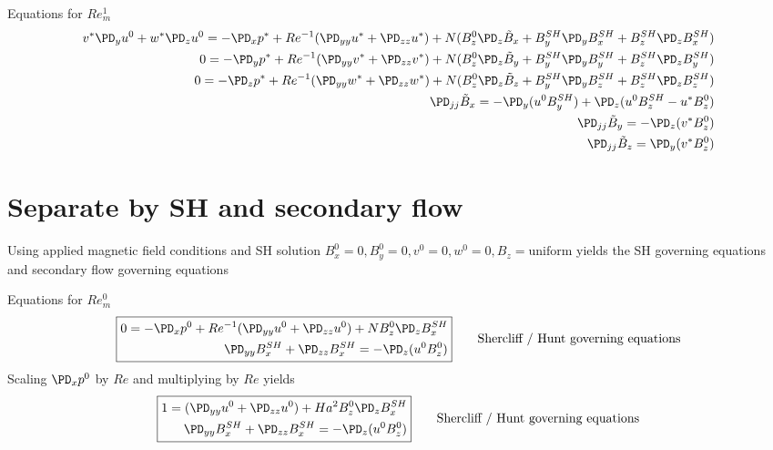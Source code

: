 \documentclass[11pt]{article}
\newcommand{\BS}{B^{SH}}
\newcommand{\BT}{\tilde{B}}
\begin{document}
Equations for $Re_m^1 $
\small\begin{equation}\begin{aligned}
v^* \PD_y u^0 + w^* \PD_z u^0 = -\PD_x p^*+ Re^{-1} (\PD_{yy} u^* + \PD_{zz} u^*) + N ( B_z^0 \PD_z \BT_x + \BS_y \PD_y \BS_x + \BS_z \PD_z \BS_x ) \\
0                             = -\PD_y p^*+ Re^{-1} (\PD_{yy} v^* + \PD_{zz} v^*) + N ( B_z^0 \PD_z \BT_y + \BS_y \PD_y \BS_y + \BS_z \PD_z \BS_y ) \\
0                             = -\PD_z p^*+ Re^{-1} (\PD_{yy} w^* + \PD_{zz} w^*) + N ( B_z^0 \PD_z \BT_z + \BS_y \PD_y \BS_z + \BS_z \PD_z \BS_z ) \\
\PD_{jj} \BT_x =-\PD_y ( u^0 \BS_y) + \PD_z ( u^0 \BS_z - u^* B_z^0) \\
\PD_{jj} \BT_y =-\PD_z ( v^* B_z^0) \\
\PD_{jj} \BT_z = \PD_y ( v^* B_z^0) \\
\end{aligned}\end{equation}\normalsize

\section{Separate by SH and secondary flow}
Using applied magnetic field conditions and SH solution $B_x^0=0,B_y^0=0,v^0=0,w^0=0,B_z=\text{uniform}$ yields the SH governing equations and secondary flow governing equations

Equations for $Re_m^0$
\begin{equation}\boxed{\begin{aligned}
0 = -\PD_x p^0 + Re^{-1} (\PD_{yy} u^0 + \PD_{zz} u^0) + N B_z^0 \PD_z \BS_x \\
\PD_{yy} \BS_x + \PD_{zz} \BS_x = - \PD_z (u^0 B_z^0) \\
\end{aligned}} \qquad \text{Shercliff / Hunt governing equations}\end{equation}
Scaling $\PD_x p^0$ by $Re$ and multiplying by $Re$ yields
\begin{equation}\boxed{\begin{aligned}
1 = (\PD_{yy} u^0 + \PD_{zz} u^0) + Ha^2 B_z^0 \PD_z \BS_x \\
\PD_{yy} \BS_x + \PD_{zz} \BS_x = - \PD_z (u^0 B_z^0) \\
\end{aligned}} \qquad \text{Shercliff / Hunt governing equations}\end{equation}
\end{document}
